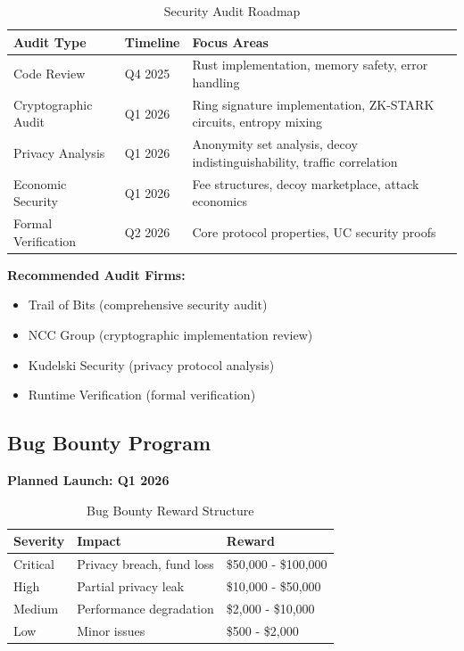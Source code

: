 \documentclass[12pt,a4paper]{article}
\begin{document}
\begin{table}[h]
\centering
\begin{tabular}{llp{5cm}}
\toprule
\textbf{Audit Type} & \textbf{Timeline} & \textbf{Focus Areas} \\
\midrule
Code Review & Q4 2025 & Rust implementation, memory safety, error handling \\
Cryptographic Audit & Q1 2026 & Ring signature implementation, ZK-STARK circuits, entropy mixing \\
Privacy Analysis & Q1 2026 & Anonymity set analysis, decoy indistinguishability, traffic correlation \\
Economic Security & Q1 2026 & Fee structures, decoy marketplace, attack economics \\
Formal Verification & Q2 2026 & Core protocol properties, UC security proofs \\
\bottomrule
\end{tabular}
\caption{Security Audit Roadmap}
\end{table}

\textbf{Recommended Audit Firms:}
\begin{itemize}
\item Trail of Bits (comprehensive security audit)
\item NCC Group (cryptographic implementation review)
\item Kudelski Security (privacy protocol analysis)
\item Runtime Verification (formal verification)
\end{itemize}

\subsection{Bug Bounty Program}

\textbf{Planned Launch: Q1 2026}

\begin{table}[h]
\centering
\begin{tabular}{lll}
\toprule
\textbf{Severity} & \textbf{Impact} & \textbf{Reward} \\
\midrule
Critical & Privacy breach, fund loss & \$50,000 - \$100,000 \\
High & Partial privacy leak & \$10,000 - \$50,000 \\
Medium & Performance degradation & \$2,000 - \$10,000 \\
Low & Minor issues & \$500 - \$2,000 \\
\bottomrule
\end{tabular}
\caption{Bug Bounty Reward Structure}
\end{table}
\end{document}
